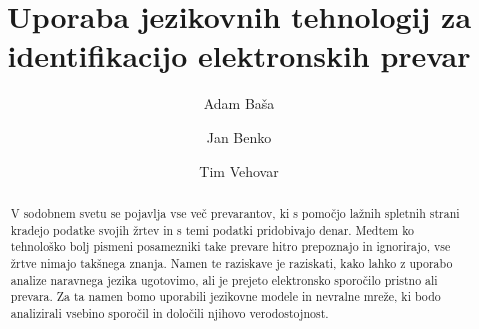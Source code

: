 \documentclass[sigconf,nonacm]{acmart}
\begin{document}
\title{Uporaba jezikovnih tehnologij za identifikacijo elektronskih prevar}


\author{Adam Baša}

\author{Jan Benko}

\author{Tim Vehovar}

\begin{abstract}
V sodobnem svetu se pojavlja vse več prevarantov, ki s pomočjo lažnih spletnih strani kradejo podatke svojih žrtev in s temi podatki pridobivajo denar. Medtem ko tehnološko bolj pismeni posamezniki take prevare hitro prepoznajo in ignorirajo, vse žrtve nimajo takšnega znanja. Namen te raziskave je raziskati, kako lahko z uporabo analize naravnega jezika ugotovimo, ali je prejeto elektronsko sporočilo pristno ali prevara. Za ta namen bomo uporabili jezikovne modele in nevralne mreže, ki bodo analizirali vsebino sporočil in določili njihovo verodostojnost.
\end{abstract}
\end{document}
